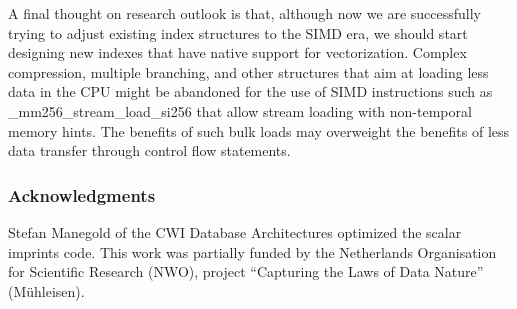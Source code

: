 \documentclass[sigconf]{acmart}
\begin{document}
A final thought on research outlook is that, although now we are successfully trying to adjust existing index structures to the SIMD era, we should start designing new indexes that have native support for vectorization. Complex compression, multiple branching, and other structures that aim at loading less data in the CPU might be abandoned for the use of SIMD instructions such as \_mm256\_stream\_load\_si256 that allow stream loading with non-temporal memory hints. The benefits of such bulk loads may overweight the benefits of less data transfer through control flow statements.

\subsubsection*{Acknowledgments}
Stefan Manegold of the CWI Database Architectures optimized the scalar imprints code. This work was partially funded by the Netherlands Organisation for Scientific Research (NWO), project ``Capturing the Laws of Data Nature'' (M\"uhleisen).


 
\end{document}
